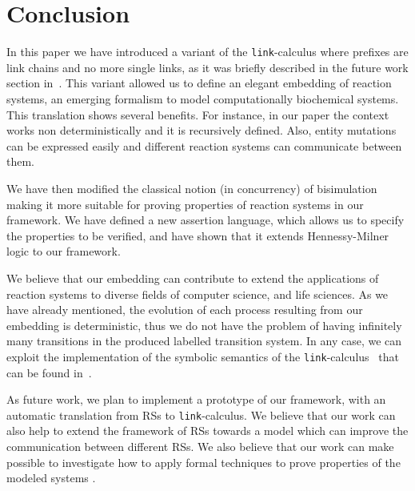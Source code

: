 
\section{Conclusion}\label{sec:conclusion}

In this paper we have introduced a variant of the {\tt link}-calculus
where prefixes are link chains and no more single links, as it was 
briefly described in the future work section in~\cite{BBB17}.
This variant allowed us to define 
an elegant embedding of reaction systems,
an emerging formalism to model computationally biochemical systems.
This translation shows several benefits.
{\color{red} For instance, in our paper the context works non deterministically and it is recursively defined.}
Also, entity mutations can be expressed easily and different reaction systems can
communicate between them.

We have then modified the classical notion (in concurrency) of bisimulation
making it more suitable for proving properties of reaction systems in our
framework.
We have defined a new assertion language, which allows us to specify
the properties to be verified, and have shown that it extends Hennessy-Milner logic
to our framework.

We believe that our embedding can contribute to extend the applications
of reaction systems to diverse fields of computer science, and life
sciences.
As we have already mentioned, the evolution of each process resulting from our embedding 
is deterministic, thus we do not have the problem of having infinitely many transitions
in the produced labelled transition system. In any case, we can exploit the implementation of  the symbolic semantics of the {\tt link}-calculus~\cite{BrodoO17} that can be found in~\cite{tool}.


As future work, we plan to implement a prototype of our framework,
with an automatic translation from RSs to  {\tt link}-calculus. 
We believe that our work can also help to extend the framework
of RSs towards a model which can improve the communication
between different RSs. We also believe that our work can make 
possible to investigate how to apply formal techniques to prove 
properties of the
modeled systems \cite{CFHOT15,OCHF16,BBGLBH2017}.

